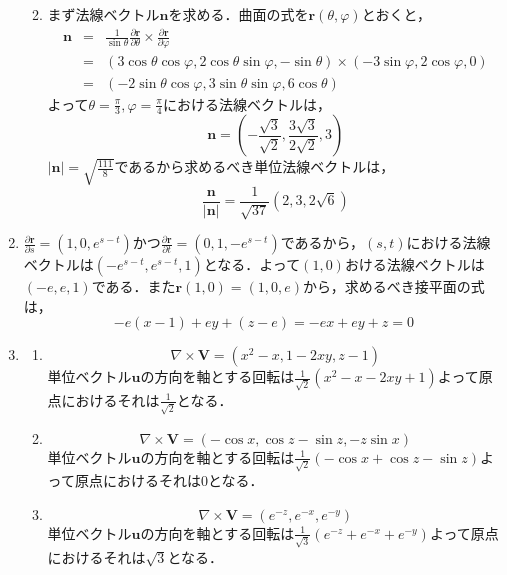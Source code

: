 \documentclass{jarticle}
\begin{document}
\begin{enumerate}
\begin{enumerate}
     \vspace{150pt}
        \item
          まず法線ベクトル${\bm n}$を求める．曲面の式を${\bm r}(\theta,\varphi)$とおくと，
          \begin{eqnarray*}
          {\bm n} & = & \frac{1}{\sin\theta}\frac{\partial {\bm r}}{\partial \theta} \times \frac{\partial \bm r}{\partial \varphi} \\ 
          & = & (3\cos\theta\cos\varphi,2\cos\theta\sin\varphi,-\sin\theta) \times (-3\sin\varphi,2\cos\varphi,0) \\
          & = & (-2\sin\theta\cos\varphi,3\sin\theta\sin\varphi,6\cos\theta)
          \end{eqnarray*}
          よって$\theta=\frac{\pi}{3},\varphi=\frac{\pi}{4}$における法線ベクトルは，
          \[ \bm n = (-\frac{\sqrt{3}}{\sqrt{2}},\frac{3\sqrt{3}}{2\sqrt{2}},3) \]
          $|\bm n| = \sqrt{\frac{111}{8}}$であるから求めるべき単位法線ベクトルは，
          \[ \frac{\bm n}{|\bm n|} = \frac{1}{\sqrt{37}} (2,3,2\sqrt{6})\]
      \end{enumerate}
    \item
      $\frac{\partial \bm r}{\partial s} = (1,0,e^{s-t})$かつ$\frac{\partial \bm r}{\partial t} = (0,1,-e^{s-t})$であるから，$(s,t)$における法線ベクトルは$(-e^{s-t},e^{s-t},1)$となる．よって$(1,0)$おける法線ベクトルは$(-e,e,1)$である．また${\bm r}(1,0) = (1,0,e)$から，求めるべき接平面の式は，
      \[ -e(x-1)+ey+(z-e)=-ex+ey+z=0 \]
    \item
      \begin{enumerate}
        \item
          \[\nabla \times {\bm V} = (x^2-x,1-2xy,z-1)\]
          単位ベクトル$\bm u$の方向を軸とする回転は$\frac{1}{\sqrt 2}( x^2-x -2xy+1)$よって原点におけるそれは$\frac{1}{\sqrt{2}}$となる．
        \item
          \[\nabla \times {\bm V} = (-\cos x, \cos z - \sin z, -z\sin x)\]
          単位ベクトル$\bm u$の方向を軸とする回転は$\frac{1}{\sqrt 2}( -\cos x+\cos z -\sin z)$よって原点におけるそれは$0$となる．
        \item
          \[\nabla \times {\bm V} = (e^{-z},e^{-x},e^{-y})\]
          単位ベクトル$\bm u$の方向を軸とする回転は$\frac{1}{\sqrt 3}(e^{-z}+e^{-x}+e^{-y})$よって原点におけるそれは$\sqrt{3}$となる．

\end{enumerate}
\end{enumerate}
\end{document}

